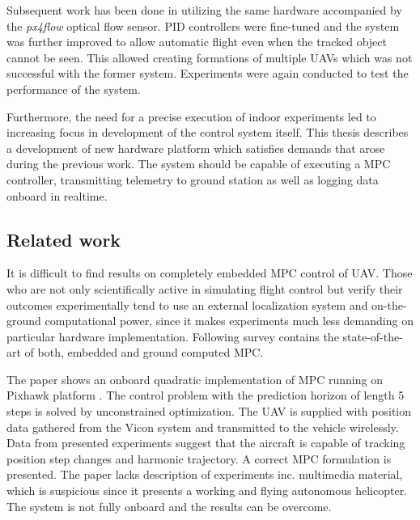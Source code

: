 Subsequent work has been done in \citep{endrych2014} utilizing the same hardware accompanied by the \textit{px4flow} optical flow sensor. PID controllers were fine-tuned and the system was further improved to allow automatic flight even when the tracked object cannot be seen. This allowed creating formations of multiple UAVs which was not successful with the former system. Experiments were again conducted to test the performance of the system.

Furthermore, the need for a precise execution of indoor experiments led to increasing focus in development of the control system itself. This thesis describes a development of new hardware platform which satisfies demands that arose during the previous work. The system should be capable of executing a MPC controller, transmitting telemetry to ground station as well as logging data onboard in realtime. 

\subsection{Related work}
\label{cap:related_work}

It is difficult to find results on completely embedded MPC control of UAV. Those who are not only scientifically active in simulating flight control but verify their outcomes experimentally tend to use an external localization system and on-the-ground computational power, since it makes experiments much less demanding on particular hardware implementation. Following survey contains the state-of-the-art of both, embedded and ground computed MPC.

The paper \citep{bangura2014realtimempc} shows an onboard quadratic implementation of MPC running on Pixhawk platform \citep{pixhawk}. The control problem with the prediction horizon of length 5 steps is solved by unconstrained optimization. The UAV is supplied with position data gathered from the Vicon system and transmitted to the vehicle wirelessly. Data from presented experiments suggest that the aircraft is capable of tracking position step changes and harmonic trajectory. A correct MPC formulation is presented. The paper lacks description of experiments inc. multimedia material, which is suspicious since it presents a working and flying autonomous helicopter. The system is not fully onboard and the results can be overcome.

